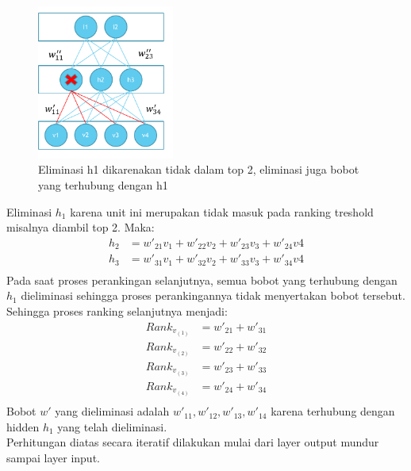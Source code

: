 \begin{figure}
	\centering
	\includegraphics[width=0.4\textwidth]
		{pics/multistep3.png}
	\caption{Eliminasi h1 dikarenakan tidak dalam top 2, eliminasi juga bobot yang terhubung dengan h1 }
	\label{fig:multistep3}
\end{figure}
Eliminasi $h_1$ karena unit ini merupakan tidak masuk pada ranking treshold misalnya diambil top 2. Maka:
\begin{equation}
\begin{aligned}
h_2 &= w'_{21}v_1+w'_{22}v_2+w'_{23}v_3+w'_{24}v4 \\
h_3 &= w'_{31}v_1+w'_{32}v_2+w'_{33}v_3+w'_{34}v4 \\
\end{aligned}
\label{eqmult3}
\end{equation}
Pada saat proses perankingan selanjutnya, semua bobot yang terhubung dengan $h_1$ dieliminasi sehingga proses perankingannya tidak menyertakan bobot tersebut. Sehingga proses ranking selanjutnya menjadi:
\begin{equation}
\begin{aligned}
Rank_{v_{(1)}} &= w'_{21}+w'_{31} \\
Rank_{v_{(2)}} &= w'_{22}+w'_{32} \\
Rank_{v_{(3)}} &= w'_{23}+w'_{33} \\
Rank_{v_{(4)}} &= w'_{24}+w'_{34} \\
\end{aligned}
\label{eqmult4}
\end{equation}
Bobot $w'$ yang dieliminasi adalah $w'_{11},w'_{12},w'_{13},w'_{14}$ karena terhubung dengan hidden $h_1$ yang telah dieliminasi. \\

Perhitungan diatas secara iteratif dilakukan mulai dari layer output mundur sampai layer input.
\newpage


